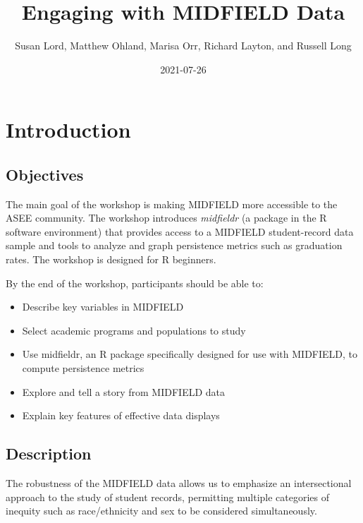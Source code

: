 \documentclass[
]{book}
\title{Engaging with MIDFIELD Data}
\author{Susan Lord, Matthew Ohland, Marisa Orr, Richard Layton, and Russell Long}
\date{2021-07-26}
\providecommand{\tightlist}{%
  \setlength{\itemsep}{0pt}\setlength{\parskip}{0pt}}
\begin{document}
\maketitle

{
\setcounter{tocdepth}{1}
\tableofcontents
}
\hypertarget{introduction}{%
\chapter{Introduction}\label{introduction}}

\hypertarget{objectives}{%
\section*{Objectives}\label{objectives}}

The main goal of the workshop is making MIDFIELD more accessible to the ASEE community. The workshop introduces \emph{midfieldr} (a package in the R software environment) that provides access to a MIDFIELD student-record data sample and tools to analyze and graph persistence metrics such as graduation rates. The workshop is designed for R beginners.

By the end of the workshop, participants should be able to:

\begin{itemize}
\tightlist
\item
  Describe key variables in MIDFIELD
\item
  Select academic programs and populations to study
\item
  Use midfieldr, an R package specifically designed for use with MIDFIELD, to compute persistence metrics
\item
  Explore and tell a story from MIDFIELD data
\item
  Explain key features of effective data displays
\end{itemize}

\hypertarget{description}{%
\section*{Description}\label{description}}

The robustness of the MIDFIELD data allows us to emphasize an intersectional approach to the study of student records, permitting multiple categories of inequity such as race/ethnicity and sex to be considered simultaneously.
\end{document}

